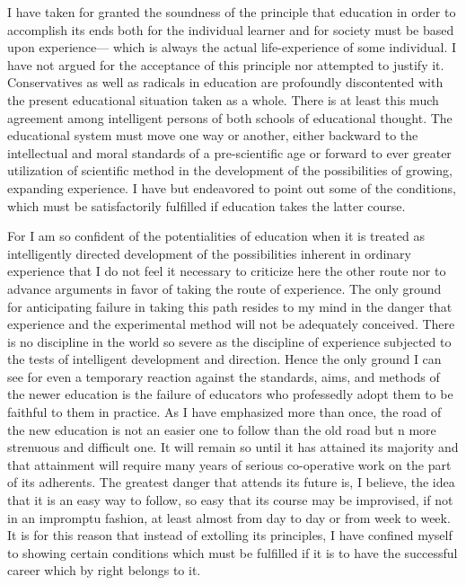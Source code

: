  I have taken for granted the soundness of the principle 
that education in order to accomplish its ends both for the individual learner and for 
society must be based upon experience— which is always the actual life-experience of 
some individual. I have not argued for the acceptance of this principle nor attempted to 
justify it. Conservatives as well as radicals in education are profoundly discontented with 
the present educational situation taken as a whole. There is at least this much agreement 
among intelligent persons of both schools of educational thought. The educational system 
must move one way or another, either backward to the intellectual and moral standards of 
a pre-scientific age or forward to ever greater utilization of scientific method in the 
development of the possibilities of growing, expanding experience. I have but 
endeavored to point out some of the conditions, which must be satisfactorily fulfilled if 
education takes the latter course. 


For I am so confident of the potentialities of education when it is treated as 
intelligently directed development of the possibilities inherent in ordinary experience that 
I do not feel it necessary to criticize here the other route nor to advance arguments in 
favor of taking the route of experience. The only ground for anticipating failure in taking 
this path resides to my mind in the danger that experience and the experimental method 
will not be adequately conceived. There is no discipline in the world so severe as the 
discipline of experience subjected to the tests of intelligent development and direction. 
Hence the only ground I can see for even a temporary reaction against the standards, 
aims, and methods of the newer education is the failure of educators who professedly 
adopt them to be faithful to them in practice. As I have emphasized more than once, the 
road of the new education is not an easier one to follow than the old road but n more 
strenuous and difficult one. It will remain so until it has attained its majority and that 
attainment will require many years of serious co-operative work on the part of its 
adherents. The greatest danger that attends its future is, I believe, the idea that it is an 
easy way to follow, so easy that its course may be improvised, if not in an impromptu 
fashion, at least almost from day to day or from week to week. It is for this reason that 
instead of extolling its principles, I have confined myself to showing certain conditions 
which must be fulfilled if it is to have the successful career which by right belongs to it. 

